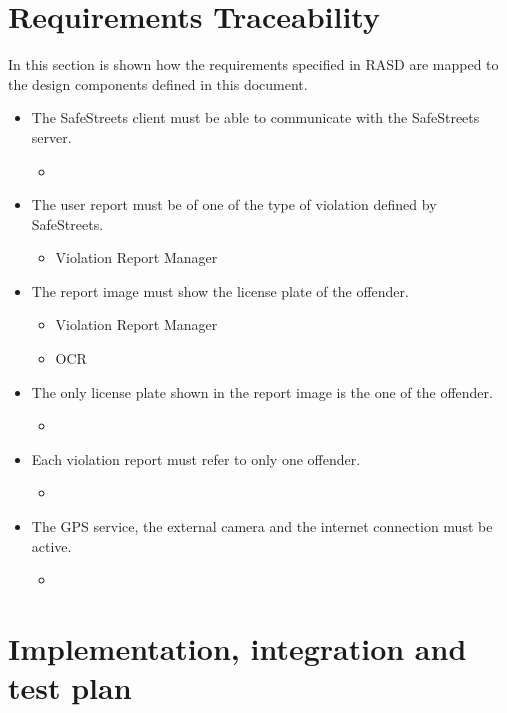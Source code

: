 \documentclass{article}
\newcommand\requirement[1]{\item[{[R#1]}] }
\begin{document}
	\clearpage	
	\section{Requirements Traceability}
		In this section is shown how the requirements specified in RASD are mapped
		to the design components defined in this document.
		\begin{itemize}
			\requirement{1} The SafeStreets client must be able to communicate with the SafeStreets server.
			\begin{itemize}
				\item 
			\end{itemize}
			\requirement{2} The user report must be of one of the type of violation defined by SafeStreets.
			\begin{itemize}
				\item Violation Report Manager
			\end{itemize}
			\requirement{3} The report image must show the license plate of the offender.
			\begin{itemize}
				\item Violation Report Manager 
				\item OCR
			\end{itemize}
			\requirement{4} The only license plate shown in the report image is the one of the offender.
			\begin{itemize}
				\item 
			\end{itemize}
			\requirement{5} Each violation report must refer to only one offender.	
			\begin{itemize}
				\item 
			\end{itemize}
			\requirement{6} The GPS service, the external camera and the internet connection must be active.
			\begin{itemize}
				\item 
			\end{itemize}
		\end{itemize}
			
	\clearpage	
	\section{Implementation, integration and test plan}
\end{document}
